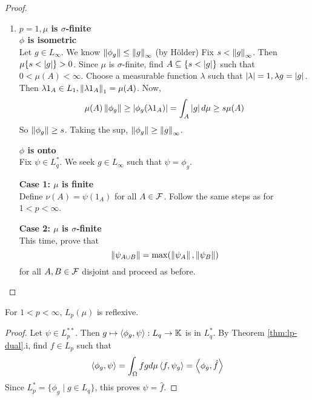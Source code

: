 \documentclass{article}
\begin{document}
\begin{proof}
\begin{enumerate}
    {\bf Case 3: General $n$} \\
    First observe that, for $f \in L_p(\mu)$, $\{f \ne 0\}$ is $\sigma$-finite. Indeed,
    $$\{f \ne 0\} = \Union_n \curlybrack{\frac 1n < \abs f}$$
    and
    $$\mu\curlybrack{\frac 1n < \abs f} \le \abs{n ^ p} \norm f_p^p < \infty \text{ by Markov}$$
    Choose $f_n \in B_{L_p}$ such that $\psi(f_n) \mor \norm\psi$. Then $A = \Union_n\{f_n \ne 0\}$ is $\sigma$-finite and $\norm{\psi_A} = \norm\psi$. By the claim,
    $$\norm\psi = \left(\norm{\psi_A}^q + \norm{\psi_{A^c}}^q\right)^{\frac 1q}$$
    So $\Psi_{A^c} = 0$. By Case 2, find $g \in L_q(\mu_A) \subseteq L_q(\mu)$ such that $\psi_A = \phi_g$, so that
    $$\psi(f) = \psi_A{f\restriction_A} + \psi{A^c}(f\restriction{A^c}) = \int_A fg d\mu + 0 = \int_\Omega fg d\mu$$
    \item {\bf $p = 1, \mu$ is $\sigma$-finite} \\
    {\bf $\phi$ is isometric} \\
    Let $g \in L_\infty$. We know $\left\lVert \phi_g\right\rVert \le \left\lVert g\right\rVert_\infty$ (by Hölder) Fix $s < \left\lVert g\right\rVert_\infty$. Then $\mu\{s < \left\lvert g\right\rvert\} > 0$. Since $\mu$ is $\sigma$-finite, find $A \subseteq \{s < \left\lvert g\right\rvert\}$ such that $0 < \mu(A) < \infty$. Choose a measurable function $\lambda$ such that $\left\lvert \lambda\right\rvert = 1, \lambda g = \left\lvert g\right\rvert$. Then $\lambda 1_A \in L_1, \left\lVert \lambda 1_A\right\rVert_1 = \mu(A)$. Now,
    $$\mu(A)\left\lVert \phi_g\right\rVert \ge \left\lvert \phi_g(\lambda 1_A)\right\rvert = \int_A \left\lvert g\right\rvert d\mu \ge s\mu(A)$$
    So $\left\lVert \phi_g\right\rVert \ge s$. Taking the sup, $\left\lVert \phi_g\right\rVert \ge \left\lVert g\right\rVert_\infty$.

    {\bf $\phi$ is onto} \\
    Fix $\psi \in L_q^*$. We seek $g \in L_\infty$ such that $\psi = \phi_g$.

    {\bf Case 1: $\mu$ is finite} \\
    Define $\nu(A) = \psi(1_A)$ for all $A \in \mathcal F$. Follow the same steps as for $1 < p < \infty$.

    {\bf Case 2: $\mu$ is $\sigma$-finite} \\
    This time, prove that
    $$\left\lVert \psi_{A \cup B}\right\rVert = \max(\left\lVert \psi_A\right\rVert, \left\lVert \psi_B\right\rVert)$$
    for all $A, B \in \mathcal F$ disjoint and proceed as before.
  \end{enumerate}
\end{proof}

\begin{ncor}
  For $1 < p < \infty$, $L_p(\mu)$ is reflexive.
\end{ncor}
\begin{proof}
  Let $\psi \in L_p^{**}$. Then $g \mapsto \left\langle \phi_g, \psi\right\rangle : L_q \rightarrow \mathbb K$ is in $L_q^*$. By Theorem \ref{thm:lp-dual}.i, find $f \in L_p$ such that
  $$\left\langle \phi_g, \psi\right\rangle = \int_\Omega fg d\mu \left\langle f, \psi_g\right\rangle = \left\langle \phi_g, \hat f\right\rangle$$
  Since $L_p^* = \{\phi_g \mid g \in L_q\}$, this proves $\psi = \hat f$.
\end{proof}
\end{document}
